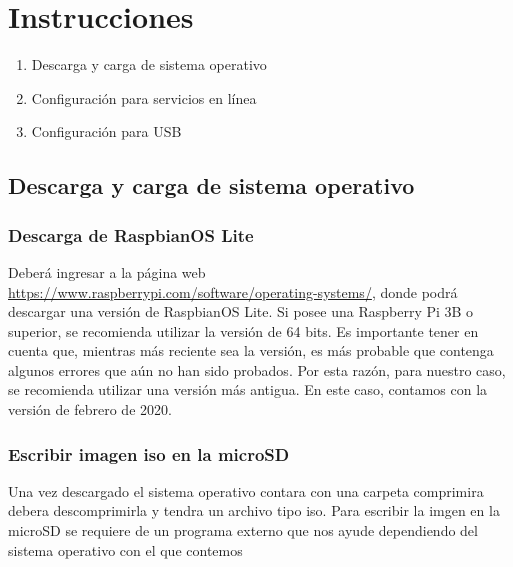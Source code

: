 \documentclass[report,12pt]{article}
\begin{document}
	\section{Instrucciones}
	\begin{enumerate}[itemsep=0pt]
		\item Descarga y carga de sistema operativo
		\item Configuración para servicios en línea
		\item Configuración para USB
	\end{enumerate}
	
	\subsection{Descarga y carga de sistema operativo}

	\subsubsection{Descarga de RaspbianOS Lite}
	Deberá ingresar a la página web \url{https://www.raspberrypi.com/software/operating-systems/}, donde podrá descargar una versión de RaspbianOS Lite. Si posee una Raspberry Pi 3B o superior, se recomienda utilizar la versión de 64 bits. Es importante tener en cuenta que, mientras más reciente sea la versión, es más probable que contenga algunos errores que aún no han sido probados. Por esta razón, para nuestro caso, se recomienda utilizar una versión más antigua. En este caso, contamos con la versión de febrero de 2020.
	
	\subsubsection{Escribir imagen iso en la microSD}
	Una vez descargado el sistema operativo contara con una carpeta comprimira debera descomprimirla y tendra un archivo tipo iso. Para escribir la imgen en la microSD se requiere de un programa externo que nos ayude dependiendo del sistema operativo con el que contemos 
\end{document}
